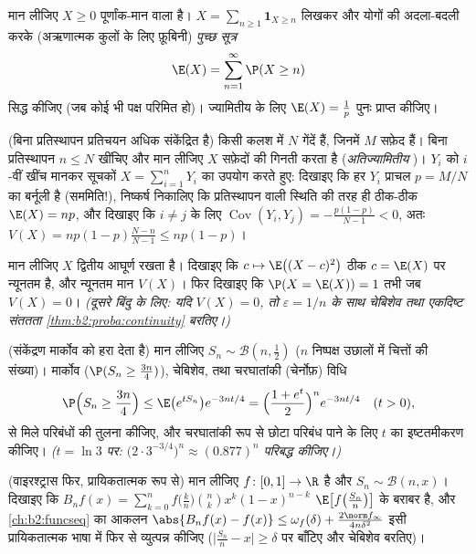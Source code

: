 \begin{exercise}[$\star\star$]\label{exo:b2:randomvar:4}
मान लीजिए $X \geq 0$ पूर्णांक-मान वाला है। $X =
\sum_{n\geq1}\mathbf{1}_{X \geq n}$ लिखकर और योगों की अदला-बदली
करके (अऋणात्मक कुलों के लिए फ़ूबिनी) \emph{पुच्छ सूत्र}
\[
\E(X) = \sum_{n=1}^{\infty} \P(X \geq n)
\]
सिद्ध कीजिए (जब कोई भी पक्ष परिमित हो)। ज्यामितीय  के लिए $\E(X) = \frac1p$
पुनः प्राप्त कीजिए।
\end{exercise}

\begin{exercise}[$\star\star$]\label{exo:b2:randomvar:5}
(बिना प्रतिस्थापन प्रतिचयन अधिक संकेंद्रित है) किसी कलश में $N$
गेंदें हैं, जिनमें $M$ सफ़ेद हैं। बिना प्रतिस्थापन $n \leq N$ खींचिए और
मान लीजिए $X$ सफ़ेदों की गिनती करता है (\emph{अतिज्यामितीय} )।
$Y_i$ को $i$-वीं खींच मानकर सूचकों $X = \sum_{i=1}^n Y_i$ का उपयोग करते हुए: दिखाइए कि
हर $Y_i$ प्राचल $p = M/N$ का बर्नूली है (सममिति!), निष्कर्ष निकालिए कि
प्रतिस्थापन वाली स्थिति की तरह ही ठीक-ठीक $\E(X) = np$, और दिखाइए कि $i
\neq j$
के लिए $\operatorname{Cov}(Y_i, Y_j) = -\frac{p(1-p)}{N-1} < 0$, अतः $V(X) = np(1-p)\frac{N - n}{N - 1} \leq np(1-p)$।
\end{exercise}

\begin{exercise}[$\star\star$]\label{exo:b2:randomvar:6}
मान लीजिए $X$ द्वितीय आघूर्ण रखता है। दिखाइए कि $c \mapsto \E\bigl((X -
c)^2\bigr)$ ठीक $c = \E(X)$ पर
न्यूनतम है, और न्यूनतम मान $V(X)$। फिर दिखाइए कि $\P(X = \E(X)) = 1$ तभी जब $V(X) =
0$।
\emph{(दूसरे बिंदु के लिए: यदि $V(X) = 0$, तो $\varepsilon = 1/n$ के साथ चेबिशेव तथा
एकदिष्ट संततता \cref{thm:b2:proba:continuity} बरतिए।)}
\end{exercise}

\begin{exercise}[$\star\star\star$]\label{exo:b2:randomvar:7}
(संकेंद्रण मार्कोव को हरा देता है) मान लीजिए $S_n \sim \mathcal{B}(n,
\frac12)$ ($n$ निष्पक्ष
उछालों में चित्तों की संख्या)। मार्कोव ($\P(S_n \geq \frac{3n}{4})$), चेबिशेव, तथा
चरघातांकी (चेर्नोफ़) विधि
\[
\P\Bigl(S_n \geq \frac{3n}4\Bigr)
\leq \E\bigl(e^{tS_n}\bigr)e^{-3nt/4}
= \Bigl(\frac{1 + e^t}{2}\Bigr)^n e^{-3nt/4}
\quad (t > 0),
\]
से मिले परिबंधों की तुलना कीजिए, और चरघातांकी रूप से छोटा परिबंध
पाने के लिए $t$ का इष्टतमीकरण कीजिए। \emph{($t = \ln 3$ पर: $\bigl(2\cdot 3^{-3/4}\bigr)^n \approx
(0.877)^n$ परिबद्ध
कीजिए।)}
\end{exercise}

\begin{exercise}[$\star\star\star$]\label{exo:b2:randomvar:8}
(वाइरश्ट्रास फिर, प्रायिकतात्मक रूप से) मान लीजिए $f \colon [0,1] \to \R$  है और
$S_n \sim \mathcal{B}(n, x)$। दिखाइए कि  $B_nf(x) = \sum_{k=0}^n f\bigl(\frac
kn\bigr)\binom nk x^k(1-x)^{n-k}$ $\E\bigl[f\bigl(\frac{S_n}{n}\bigr)\bigr]$ के बराबर है, और \cref{ch:b2:funcseq} का
आकलन $\abs{B_nf(x) - f(x)} \leq \omega_f(\delta) +
\frac{2\norm f_\infty}{4n\delta^2}$ इसी प्रायिकतात्मक भाषा में फिर से व्युत्पन्न कीजिए ($\bigl|\frac{S_n}{n} -
x\bigr| \geq \delta$
पर बाँटिए और चेबिशेव बरतिए)।
\end{exercise}


